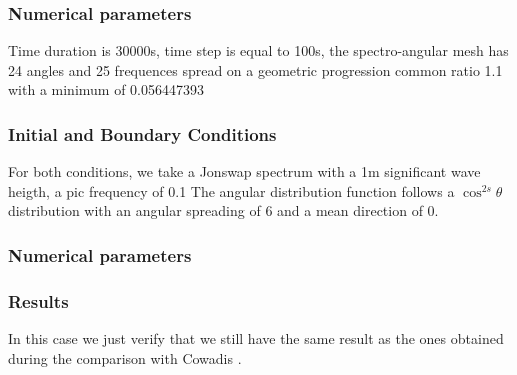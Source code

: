 %
\subsubsection{Numerical parameters}
%
Time duration is 30000s, time step is equal to 100s, the spectro-angular mesh
has 24 angles and 25 frequences spread on a geometric progression common ratio
1.1 with a minimum of 0.056447393

\subsubsection{Initial and Boundary Conditions}
%
For both conditions, we take a Jonswap spectrum with a 1m significant wave
heigth, a pic frequency of 0.1 The angular distribution function follows a
$\cos^{2s} \theta$ distribution with an angular spreading of 6 and a mean
direction of 0.

\subsubsection{Numerical parameters}


%
%
\subsubsection{Results}
In this case we just verify that we still have the same result as the ones
obtained during the comparison with Cowadis \cite{cowadis}.
